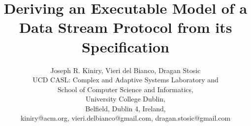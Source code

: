 \documentclass{article}
\begin{document}
\title{Deriving an Executable Model of a Data Stream Protocol from its
Specification}

\author{Joseph R. Kiniry, Vieri del Bianco, Dragan Stosic\\
UCD CASL: Complex and Adaptive Systems Laboratory and\\
School of Computer Science and Informatics,\\
University College Dublin,\\
Belfield, Dublin 4, Ireland,\\
kiniry@acm.org, vieri.delbianco@gmail.com, dragan.stosic@gmail.com\\
}

\maketitle
\end{document}
